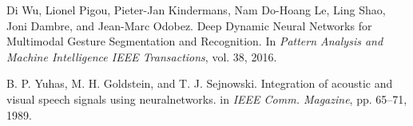 \begin{thebibliography}{99}
  Di Wu, Lionel Pigou, Pieter-Jan Kindermans, Nam Do-Hoang Le, Ling Shao,
  Joni Dambre, and Jean-Marc Odobez. 
  Deep Dynamic Neural Networks for Multimodal Gesture Segmentation and
  Recognition. In \textit{Pattern Analysis and Machine Intelligence
  IEEE Transactions}, vol. 38, 2016.

  B. P. Yuhas, M. H. Goldstein, and T. J. Sejnowski. Integration of acoustic
  and visual speech signals using neuralnetworks. in \textit{IEEE Comm.
  Magazine}, pp. 65--71, 1989.

\end{thebibliography}
